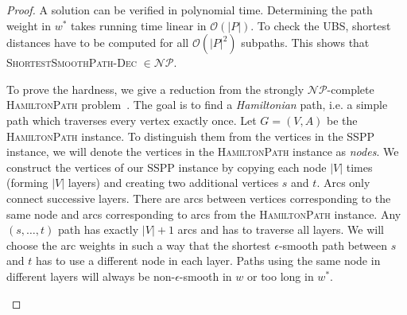 \documentclass[a4paper,UKenglish,cleveref, autoref, thm-restate]{lipics-v2021}
\begin{document}
\begin{proof}
A solution can be verified in polynomial time.
Determining the path weight in $w^*$ takes running time linear in $\mathcal{O}(|P|)$.
To check the UBS, shortest distances have to be computed for all $\mathcal{O}(|P|^2)$ subpaths.
This shows that \textsc{ShortestSmoothPath-Dec} $\in \mathcal{NP}$.

To prove the hardness, we give a reduction from the strongly $\mathcal{NP}$-complete \textsc{HamiltonPath} problem~\cite{gj-ci-79}.
The goal is to find a \emph{Hamiltonian} path, i.e. a simple path which traverses every vertex exactly once.
Let $G=(V,A)$ be the \textsc{HamiltonPath} instance.
To distinguish them from the vertices in the SSPP instance, we will denote the vertices in the \textsc{HamiltonPath} instance as \emph{nodes}.
We construct the vertices of our SSPP instance by copying each node $|V|$ times (forming $|V|$ layers) and creating two additional vertices $s$ and $t$.
Arcs only connect successive layers.
There are arcs between vertices corresponding to the same node and arcs corresponding to arcs from the \textsc{HamiltonPath} instance.
Any $(s,\dots,t)$ path has exactly $|V|+1$ arcs and has to traverse all layers.
We will choose the arc weights in such a way that the shortest $\epsilon$-smooth path between $s$ and $t$ has to use a different node in each layer.
Paths using the same node in different layers will always be non-$\epsilon$-smooth in $w$ or too long in $w^*$.

\begin{figure}
\centering
{}
\end{figure}
\end{proof}
\end{document}

